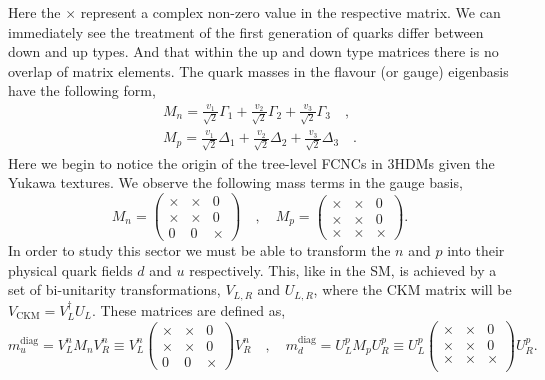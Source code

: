 \documentclass[10pt]{report}
\begin{document}
%
Here the $\times$ represent a complex non-zero value in the respective matrix. 
%
We can immediately see the treatment of the first generation of quarks differ between down and up types.  And that within the up and down type matrices there is no overlap of matrix elements.  
% 
The quark masses in the flavour (or gauge) eigenbasis have the following form,
\begin{equation}
\label{eq:3HDM_Quark_gauge_mass}
\begin{split}
M_n = \frac{v_1}{\sqrt{2}} \Gamma_1 +  \frac{v_2}{\sqrt{2}} \Gamma_2 +  \frac{v_3}{\sqrt{2}} \Gamma_3  \quad , \\ 
M_p = \frac{v_1}{\sqrt{2}} \Delta_1 +  \frac{v_2}{\sqrt{2}} \Delta_2 +  \frac{v_3}{\sqrt{2}} \Delta_3   \quad .
\end{split}
\end{equation}
%
Here we begin to notice the origin of the tree-level FCNCs in 3HDMs given the Yukawa textures. We observe the following mass terms in the gauge basis, 
%
\begin{equation}
M_n = \begin{pmatrix}
\times & \times & 0 \\
\times & \times & 0 \\
0 & 0 & \times 
\end{pmatrix} 
\quad , \quad 
M_p=\begin{pmatrix}
\times & \times & 0 \\
\times & \times & 0 \\
\times & \times & \times 
\end{pmatrix} .
\end{equation}
%
In order to study this sector we must be able to transform the $n$ and $p$ into their physical quark fields $d$ and $u$ respectively. 
%
This, like in the SM, is achieved by a set of bi-unitarity transformations, $V_{L,R}$ and $U_{L,R}$, where the CKM matrix will be $V_{\text{CKM}} = V_L^\dagger U_L$. These matrices are defined as, 
%
\begin{equation}
m_u^{\text{diag}} = V_L^n M_n V_R^n \equiv V_L^n \begin{pmatrix}
\times & \times & 0 \\
\times & \times & 0 \\
0 & 0 & \times 
\end{pmatrix}  V_R^n  \quad , \quad 
m_d^{\text{diag}} = U_L^p  M_p U_R^p \equiv U_L^p \begin{pmatrix}
\times & \times & 0 \\
\times & \times & 0 \\
\times & \times & \times \\ \end{pmatrix} U_R^p . 
\end{equation}
\end{document}
